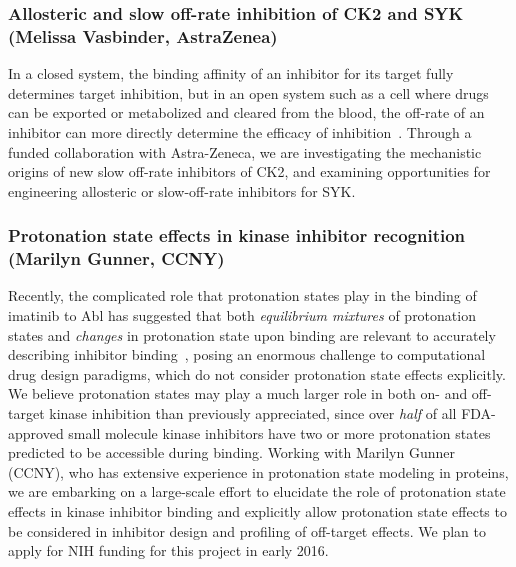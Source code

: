 \documentclass[10pt]{article}
\begin{document}
\vspace{-0.5cm}
\subsubsection*{Allosteric and slow off-rate inhibition of CK2 and SYK (Melissa Vasbinder, AstraZenea)}
\vspace{-0.3cm}
In a closed system, the binding affinity of an inhibitor for its target fully determines target inhibition, but in an open system such as a cell where drugs can be exported or metabolized and cleared from the blood, the off-rate of an inhibitor can more directly determine the efficacy of inhibition~\cite{copeland:nrdd:2007:residence-time}.
Through a funded collaboration with Astra-Zeneca, we are investigating the mechanistic origins of new slow off-rate inhibitors of CK2, and examining opportunities for engineering allosteric or slow-off-rate inhibitors for SYK.

\vspace{-0.5cm}
\subsubsection*{Protonation state effects in kinase inhibitor recognition (Marilyn Gunner, CCNY)}
\vspace{-0.3cm}
Recently, the complicated role that protonation states play in the binding of imatinib to Abl has suggested that both \emph{equilibrium mixtures} of protonation states and \emph{changes} in protonation state upon binding are relevant to accurately describing inhibitor binding~\cite{szakacks:j-med-chem:2005:acid-base-profiling-of-imatinib,seeliger:2007:structure:imatinib-binding,roux:pnas:2013:gleevec-selectivity}, posing an enormous challenge to computational drug design paradigms, which do not consider protonation state effects explicitly.
We believe protonation states may play a much larger role in both on- and off-target kinase inhibition than previously appreciated, since over \emph{half} of all FDA-approved small molecule kinase inhibitors have two or more protonation states predicted to be accessible during binding.
Working with Marilyn Gunner (CCNY), who has extensive experience in protonation state modeling in proteins, we are embarking on a large-scale effort to elucidate the role of protonation state effects in kinase inhibitor binding and explicitly allow protonation state effects to be considered in inhibitor design and profiling of off-target effects.
We plan to apply for NIH funding for this project in early 2016.
\end{document}
